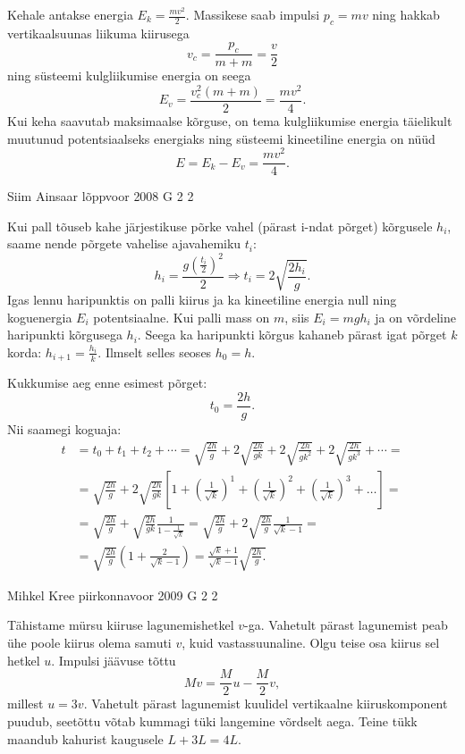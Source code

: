 \documentclass[11pt]{article}
\begin{document}
{{\ifSolution
Kehale antakse energia $E_k = \frac{mv^2}{2}$. Massikese saab impulsi $p_c = mv$ ning hakkab vertikaalsuunas liikuma kiirusega
\[
v_{c}=\frac{p_{c}}{m+m}=\frac{v}{2}
\]
ning süsteemi kulgliikumise energia on seega
\[
E_{v}=\frac{v_{c}^{2}(m+m)}{2}=\frac{m v^{2}}{4}.
\]
Kui keha saavutab maksimaalse kõrguse, on tema kulgliikumise energia täielikult muutunud potentsiaalseks energiaks ning süsteemi kineetiline energia on nüüd
\[
E = E_k - E_v = \frac{mv^2}{4}.
\]
\fi
}

{Siim Ainsaar} %
{lõppvoor} %
{2008} %
{G 2} %
{2} %
{

\ifSolution
Kui pall tõuseb kahe järjestikuse põrke vahel (pärast i-ndat põrget) kõrgusele $h_i$, saame nende põrgete vahelise ajavahemiku $t_i$:
\[
h_{i}=\frac{g\left(\frac{t_{i}}{2}\right)^{2}}{2} \Longrightarrow t_{i}=2 \sqrt{\frac{2 h_{i}}{g}}.
\]
Igas lennu haripunktis on palli kiirus ja ka kineetiline energia null ning koguenergia $E_i$ potentsiaalne. Kui palli mass on $m$, siis $E_i = mgh_i$ ja on võrdeline haripunkti kõrgusega $h_i$. Seega ka haripunkti kõrgus kahaneb pärast igat põrget $k$ korda: $h_{i+1} = \frac{h_i}{k}$. Ilmselt selles seoses $h_0 = h$.

Kukkumise aeg enne esimest põrget:
\[
t_0 = \frac{2h}{g}.
\]
Nii saamegi koguaja:
\[
\begin{aligned} 
	t &=t_{0}+t_{1}+t_{2}+\cdots=\sqrt{\frac{2 h}{g}}+2 \sqrt{\frac{2 h}{g k}} + 2 \sqrt{\frac{2 h}{g k^{2}}}+2 \sqrt{\frac{2 h}{g k^{3}}}+\cdots=\\ &=\sqrt{\frac{2 h}{g}}+2 \sqrt{\frac{2 h}{g k}}\left[1+\left(\frac{1}{\sqrt{k}}\right)^{1}+\left(\frac{1}{\sqrt{k}}\right)^{2}+\left(\frac{1}{\sqrt{k}}\right)^{3}+\ldots\right]=\\ &=\sqrt{\frac{2 h}{g}}+\sqrt{\frac{2 h}{g k}} \frac{1}{1-\frac{1}{\sqrt{k}}}=\sqrt{\frac{2 h}{g}}+2 \sqrt{\frac{2 h}{g}} \frac{1}{\sqrt{k}-1}=\\ &=\sqrt{\frac{2 h}{g}}\left(1+\frac{2}{\sqrt{k}-1}\right)=\frac{\sqrt{k}+1}{\sqrt{k}-1} \sqrt{\frac{2 h}{g}.} 
\end{aligned}
\]
\fi
}

{Mihkel Kree} %
{piirkonnavoor} %
{2009} %
{G 2} %
{2} %
{

\ifSolution
Tähistame mürsu kiiruse lagunemishetkel $v$-ga. Vahetult pärast lagunemist peab ühe poole kiirus olema samuti $v$, kuid vastassuunaline. Olgu teise osa kiirus sel hetkel $u$. Impulsi jäävuse tõttu
\[
Mv = \frac{M}{2}u - \frac{M}{2}v,
\]
millest $u=3v$. Vahetult pärast lagunemist kuulidel vertikaalne kiiruskomponent puudub, seetõttu võtab kummagi tüki langemine võrdselt aega. Teine
tükk maandub kahurist kaugusele $L + 3L = 4L$.
\fi
}

}
\end{document}
